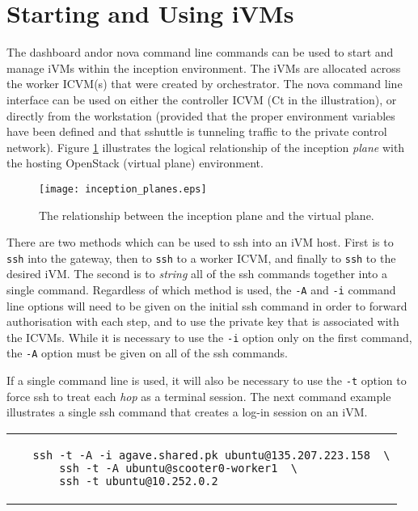 \section{Starting and Using iVMs}
The dashboard and\/or nova command line commands can be used to start and manage iVMs within the inception environment.  
The iVMs are allocated across the worker ICVM(s) that were created by orchestrator.
The nova command line interface can be used on either the controller ICVM (Ct in the illustration), or directly from 
the workstation (provided that the proper environment variables have been defined and that sshuttle is tunneling traffic
to the private control network).  
Figure \ref{fg_planes} illustrates the logical relationship of the inception \emph{plane} with the hosting 
OpenStack (virtual plane) environment. 


\begin{figure}[!ht]
  \centering
  \texttt{[image: inception\_planes.eps]}
  \tiny
  \caption{\small The relationship between the inception plane and the virtual plane.
    \label{fg_planes}\normalsize
  }
  \normalsize
\end{figure}

There are two methods which can be used to ssh into an iVM host. 
First is to \verb!ssh! into the gateway, then to \verb!ssh! to a worker ICVM, and finally to \verb!ssh! to the desired iVM. 
The second is to \emph{string} all of the ssh commands together into a single command.  
Regardless of which method is used, the \verb!-A! and \verb!-i! command line options will need to be given on the initial
ssh command in order to forward authorisation with each step, and to use the private key that is associated with the ICVMs. 
While it is necessary to use the \verb!-i! option only on the first command, the \verb!-A! option must be given on all of the
ssh commands.  

If a single command line is used, it will also be necessary to use the \verb!-t! option to force ssh to treat each \emph{hop} as 
a terminal session.  
The next command example illustrates a single ssh command that creates a log-in session on an iVM.

\small\begin{tabular}{p{\textwidth}}\begin{verbatim}
   ssh -t -A -i agave.shared.pk ubuntu@135.207.223.158  \
       ssh -t -A ubuntu@scooter0-worker1  \
       ssh -t ubuntu@10.252.0.2
\end{verbatim}
\end{tabular}
\normalsize


